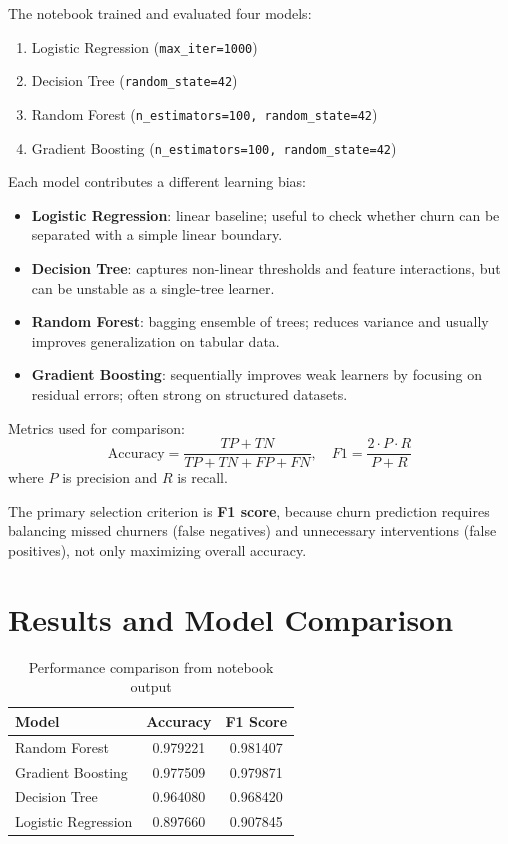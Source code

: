 \documentclass[11pt]{article}
\begin{document}
The notebook trained and evaluated four models:
\begin{enumerate}
    \item Logistic Regression (\texttt{max\_iter=1000})
    \item Decision Tree (\texttt{random\_state=42})
    \item Random Forest (\texttt{n\_estimators=100, random\_state=42})
    \item Gradient Boosting (\texttt{n\_estimators=100, random\_state=42})
\end{enumerate}

Each model contributes a different learning bias:
\begin{itemize}
    \item \textbf{Logistic Regression}: linear baseline; useful to check whether churn can be separated with a simple linear boundary.
    \item \textbf{Decision Tree}: captures non-linear thresholds and feature interactions, but can be unstable as a single-tree learner.
    \item \textbf{Random Forest}: bagging ensemble of trees; reduces variance and usually improves generalization on tabular data.
    \item \textbf{Gradient Boosting}: sequentially improves weak learners by focusing on residual errors; often strong on structured datasets.
\end{itemize}

Metrics used for comparison:
\[
\mathrm{Accuracy} = \frac{TP + TN}{TP + TN + FP + FN}, \quad
F1 = \frac{2 \cdot P \cdot R}{P + R}
\]
where \(P\) is precision and \(R\) is recall.

The primary selection criterion is \textbf{F1 score}, because churn prediction requires balancing missed churners (false negatives) and unnecessary interventions (false positives), not only maximizing overall accuracy.

\section{Results and Model Comparison}
\begin{table}[H]
\centering
\begin{tabular}{lcc}
\toprule
\textbf{Model} & \textbf{Accuracy} & \textbf{F1 Score} \\
\midrule
Random Forest & 0.979221 & 0.981407 \\
Gradient Boosting & 0.977509 & 0.979871 \\
Decision Tree & 0.964080 & 0.968420 \\
Logistic Regression & 0.897660 & 0.907845 \\
\bottomrule
\end{tabular}
\caption{Performance comparison from notebook output}
\end{table}
\end{document}
